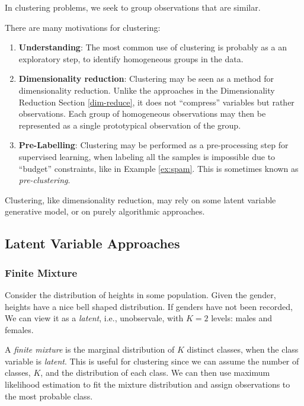 \documentclass[]{book}
\providecommand{\tightlist}{%
  \setlength{\itemsep}{0pt}\setlength{\parskip}{0pt}}
\theoremstyle{definition}
\theoremstyle{definition}
\theoremstyle{remark}
\let\BeginKnitrBlock\begin \let\EndKnitrBlock\end
\begin{document}
In clustering problems, we seek to group observations that are similar.

There are many motivations for clustering:

\begin{enumerate}
\def\labelenumi{\arabic{enumi}.}
\tightlist
\item
  \textbf{Understanding}: The most common use of clustering is probably
  as a an exploratory step, to identify homogeneous groups in the data.
\item
  \textbf{Dimensionality reduction}: Clustering may be seen as a method
  for dimensionality reduction. Unlike the approaches in the
  Dimensionality Reduction Section \ref{dim-reduce}, it does not
  ``compress'' variables but rather observations. Each group of
  homogeneous observations may then be represented as a single
  prototypical observation of the group.
\item
  \textbf{Pre-Labelling}: Clustering may be performed as a
  pre-processing step for supervised learning, when labeling all the
  samples is impossible due to ``budget'' constraints, like in Example
  \ref{ex:spam}. This is sometimes known as \emph{pre-clustering}.
\end{enumerate}

Clustering, like dimensionality reduction, may rely on some latent
variable generative model, or on purely algorithmic approaches.

\subsection{Latent Variable
Approaches}\label{latent-variable-approaches-1}

\subsubsection{Finite Mixture}\label{finite-mixture}

\BeginKnitrBlock{example}
\protect\hypertarget{ex:males-females}{}{\label{ex:males-females}}Consider
the distribution of heights in some population. Given the gender,
heights have a nice bell shaped distribution. If genders have not been
recorded, We can view it as a \emph{latent}, i.e., unobservale, with
\(K=2\) levels: males and females.
\EndKnitrBlock{example}

A \emph{finite mixture} is the marginal distribution of \(K\) distinct
classes, when the class variable is \emph{latent}. This is useful for
clustering since we can assume the number of classes, \(K\), and the
distribution of each class. We can then use maximum likelihood
estimation to fit the mixture distribution and assign observations to
the most probable class.
\end{document}
